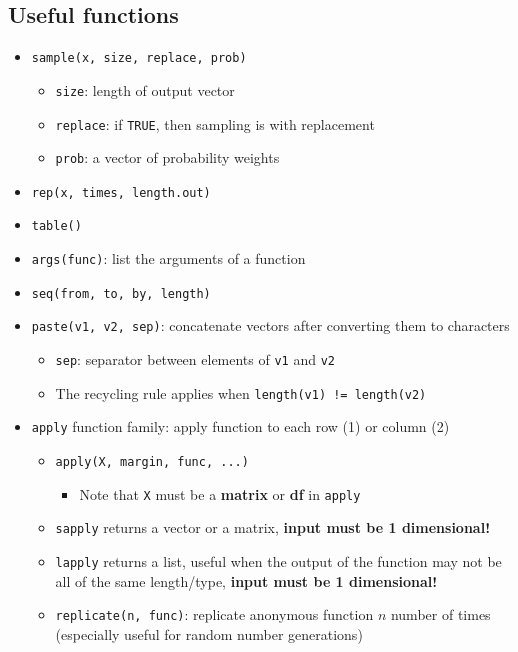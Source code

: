\documentclass{article}
\begin{document}
\begin{multicols}{2}
\subsection*{Useful functions}
\begin{itemize}
	\item \texttt{sample(x, size, replace, prob)}
	\begin{itemize}
		\item \texttt{size}: length of output vector
		\item \texttt{replace}: if \texttt{TRUE}, then sampling is with replacement
		\item \texttt{prob}: a vector of probability weights
	\end{itemize}
	\item \texttt{rep(x, times, length.out)}
	\item \texttt{table()}
	\item \texttt{args(func)}: list the arguments of a function
	\item \texttt{seq(from, to, by, length)}
	\item \texttt{paste(v1, v2, sep)}: concatenate vectors after converting them to characters
	\begin{itemize}
		\item \texttt{sep}: separator between elements of \texttt{v1} and \texttt{v2}
		\item The recycling rule applies when \texttt{length(v1) != length(v2)}
	\end{itemize}
	\item \texttt{apply} function family: apply function to each row (1) or column (2)
	\begin{itemize}
		\item \texttt{apply(X, margin, func, ...)}
		\begin{itemize}
			\item Note that \texttt{X} must be a \textbf{matrix} or \textbf{df} in \texttt{apply}
		\end{itemize}
		\item \texttt{sapply} returns a vector or a matrix, \textbf{input must be 1 dimensional!}
		\item \texttt{lapply} returns a list, useful when the output of the function may not be all of the same length/type, \textbf{input must be 1 dimensional!}
		\item \texttt{replicate(n, func)}: replicate anonymous function $n$ number of times (especially useful for random number generations)
	\end{itemize}
\end{itemize}

\end{multicols}
\end{document}
